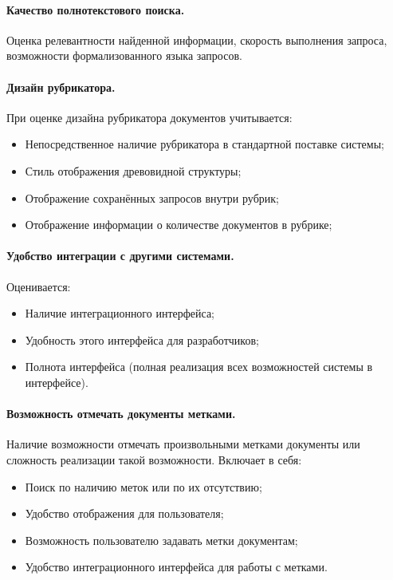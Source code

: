 \paragraph{Качество полнотекстового поиска.}
Оценка релевантности найденной информации, скорость выполнения запроса, возможности формализованного языка запросов.

\paragraph{Дизайн рубрикатора.}
При оценке дизайна рубрикатора документов учитывается:
\begin{itemize}
\item Непосредственное наличие рубрикатора в стандартной поставке системы;
\item Стиль отображения древовидной структуры;
\item Отображение сохранённых запросов внутри рубрик;
\item Отображение информации о количестве документов в рубрике;
\end{itemize}

\paragraph{Удобство интеграции с другими системами.} 
Оценивается:
\begin{itemize}
\item Наличие интеграционного интерфейса;
\item Удобность этого интерфейса для разработчиков;
\item Полнота интерфейса (полная реализация всех возможностей системы в интерфейсе).
\end{itemize}

\paragraph{Возможность отмечать документы метками.}
Наличие возможности отмечать произвольными метками документы или сложность реализации такой возможности. Включает в себя:
\begin{itemize}
\item Поиск по наличию меток или по их отсутствию;
\item Удобство отображения для пользователя;
\item Возможность пользователю задавать метки документам;
\item Удобство интеграционного интерфейса для работы с метками.
\end{itemize}

